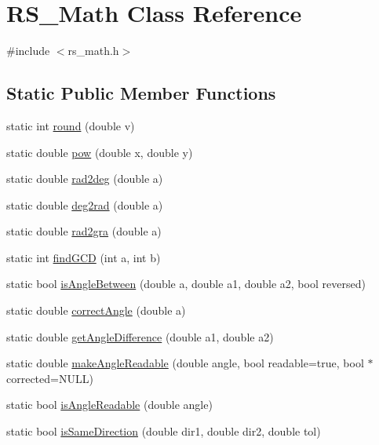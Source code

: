 \hypertarget{class_r_s___math}{\section{R\-S\-\_\-\-Math Class Reference}
\label{class_r_s___math}
}


{\ttfamily \#include $<$rs\-\_\-math.\-h$>$}

\subsection*{Static Public Member Functions}
\begin{DoxyCompactItemize}
\item 
static int \hyperlink{class_r_s___math_ae7695e522d0318e17dd2fc21b3e3f99c}{round} (double v)
\item 
static double \hyperlink{class_r_s___math_a9b10d1b49138c3f933c85a94d249a72d}{pow} (double x, double y)
\item 
static double \hyperlink{class_r_s___math_ae61afb84e2cb74500e424d99c93fe7d2}{rad2deg} (double a)
\item 
static double \hyperlink{class_r_s___math_aed4dc3f4ff3ac2a3e7806b4d5fe3567e}{deg2rad} (double a)
\item 
static double \hyperlink{class_r_s___math_ab9a3999134521f753316eb7daa497410}{rad2gra} (double a)
\item 
static int \hyperlink{class_r_s___math_ae32b9dcb00179eb7217b4f7623ef6386}{find\-G\-C\-D} (int a, int b)
\item 
static bool \hyperlink{class_r_s___math_a58f104087961a23ade3aa3f3871681db}{is\-Angle\-Between} (double a, double a1, double a2, bool reversed)
\item 
static double \hyperlink{class_r_s___math_a046f3f94c15c641370629145d1406dc5}{correct\-Angle} (double a)
\item 
static double \hyperlink{class_r_s___math_a187bcc2597095880b0340f8898932850}{get\-Angle\-Difference} (double a1, double a2)
\item 
static double \hyperlink{class_r_s___math_a95bc8115bfccb1b37be5edaac0e5c667}{make\-Angle\-Readable} (double angle, bool readable=true, bool $\ast$corrected=N\-U\-L\-L)
\item 
static bool \hyperlink{class_r_s___math_a88e259f58e3d468ecad07b7ca30aebb1}{is\-Angle\-Readable} (double angle)
\item 
static bool \hyperlink{class_r_s___math_a975388f1c647c850bf6fe95564bc3e0d}{is\-Same\-Direction} (double dir1, double dir2, double tol)

\end{DoxyCompactItemize}
